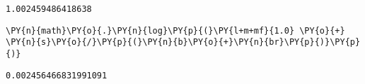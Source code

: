\par\vspace{1\smallerfontscale}%
    \begin{addmargin}[\cellleftmargin]{0em}%
    {\smaller%
    \vspace{-1\smallerfontscale}%
    
    
    
    \begin{verbatim}
1.002459486418638
    \end{verbatim}

    
}%
    \end{addmargin}%

{\par%
\vspace{-1\baselineskip}%
}%
\begin{notebookcell}[]%
\begin{addmargin}[\cellleftmargin]{0em}%
{\smaller%
\par%
%
\vspace{-1\smallerfontscale}%
\begin{Verbatim}[commandchars=\\\{\}]
\PY{n}{math}\PY{o}{.}\PY{n}{log}\PY{p}{(}\PY{l+m+mf}{1.0} \PY{o}{+} \PY{n}{s}\PY{o}{/}\PY{p}{(}\PY{n}{b}\PY{o}{+}\PY{n}{br}\PY{p}{)}\PY{p}{)}
\end{Verbatim}
%
\par%
\vspace{-1\smallerfontscale}}%
\end{addmargin}
\end{notebookcell}

\par\vspace{1\smallerfontscale}%
    \begin{addmargin}[\cellleftmargin]{0em}%
    {\smaller%
    \vspace{-1\smallerfontscale}%
    
    
    
    \begin{verbatim}
0.002456466831991091
    \end{verbatim}

    
}%
    \end{addmargin}%

